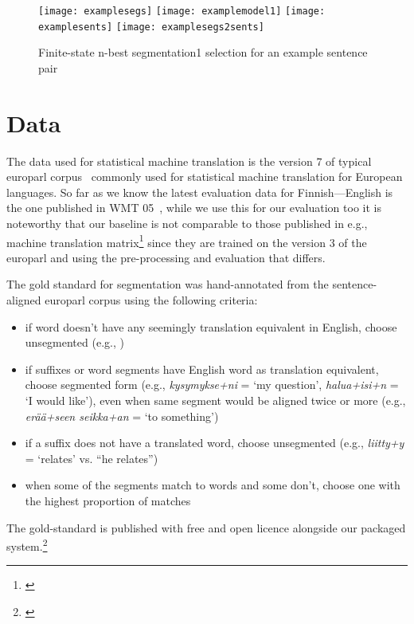 \documentclass[11pt,letterpaper]{article}
\begin{document}
\begin{figure}
    \texttt{[image: examplesegs]}
    \texttt{[image: examplemodel1]}
    \texttt{[image: examplesents]}
    \texttt{[image: examplesegs2sents]}
    \caption{\label{fig:fsa-nbest} Finite-state n-best segmentation1 selection
    for an example sentence pair}
\end{figure}

\section{Data}
\label{sec:data}

The data used for statistical machine translation is the version 7 of typical
europarl corpus~\cite{europarl} commonly used for statistical machine
translation for European languages. So far as we know the latest evaluation
data for Finnish---English is the one published in WMT 05~\cite{wmt2005shared},
while we use this for our evaluation too it is noteworthy that our baseline is
not comparable to those published in e.g., machine translation matrix\footnote{\url{}}
since they are trained on the version 3 of the europarl and using the
pre-processing and evaluation that differs. 

The gold standard for segmentation was hand-annotated from the sentence-aligned
europarl corpus using the following criteria:

\begin{itemize}
    \item if word doesn't have any seemingly translation equivalent in
        English, choose unsegmented (e.g., )
    \item if suffixes or word segments have English word as translation
        equivalent, choose segmented form (e.g., \emph{kysymykse+ni} = `my
        question', \emph{halua+isi+n} = `I would like'), even when same segment
        would be aligned twice or more (e.g., \emph{erää+seen seikka+an} = `to
        something')
    \item if a suffix does not have a translated word, choose unsegmented (e.g.,
        \emph{liitty+y} = `relates' vs. ``he relates'')
    \item when some of the segments match to words and some don't, choose one
        with the highest proportion of matches
\end{itemize}

The gold-standard is published with free and open licence alongside our packaged
system.\footnote{\url{}}
\end{document}
